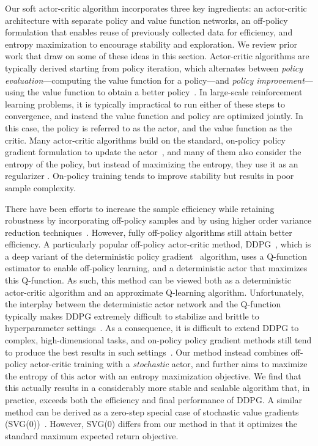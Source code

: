 Our soft actor-critic algorithm incorporates three key ingredients: an actor-critic architecture with separate policy and value function networks, an off-policy formulation that enables reuse of previously collected data for efficiency, and entropy maximization to encourage stability and exploration. We review prior work that draw on some of these ideas in this section. Actor-critic algorithms are typically derived starting from policy iteration, which alternates between \emph{policy evaluation}---computing the value function for a policy---and \emph{policy improvement}---using the value function to obtain a better policy~\citep{barto1983neuronlike,sutton1998reinforcement}. In large-scale reinforcement learning problems, it is typically impractical to run either of these steps to convergence, and instead the value function and policy are optimized jointly. In this case, the policy is referred to as the actor, and the value function as the critic. Many actor-critic algorithms build on the standard, on-policy policy gradient formulation to update the actor~\citep{peters2008reinforcement}, and many of them also consider the entropy of the policy, but instead of maximizing the entropy, they use it as an regularizer \citep{schulman2017proximal,schulman2015trust,mnih2016asynchronous,gruslys2017reactor}. On-policy training tends to improve stability but results in poor sample complexity.

There have been efforts to increase the sample efficiency while retaining robustness by incorporating off-policy samples and by using higher order variance reduction techniques~\citep{o2016pgq,gu2016q}. However, fully off-policy algorithms still attain better efficiency. A particularly popular off-policy actor-critic method, DDPG~\cite{lillicrap2015continuous}, which is a deep variant of the deterministic policy gradient~\citep{silver2014deterministic} algorithm, uses a Q-function estimator to enable off-policy learning, and a deterministic actor that maximizes this Q-function. As such, this method can be viewed both as a deterministic actor-critic algorithm and an approximate Q-learning algorithm. Unfortunately, the interplay between the deterministic actor network and the Q-function typically makes DDPG extremely difficult to stabilize and brittle to hyperparameter settings~\citep{duan2016benchmarking,henderson2017deep}. As a consequence, it is difficult to extend DDPG to complex, high-dimensional tasks, and on-policy policy gradient methods still tend to produce the best results in such settings~\citep{gu2016q}. Our method instead combines off-policy actor-critic training with a \emph{stochastic} actor, and further aims to maximize the entropy of this actor with an entropy maximization objective. We find that this actually results in a considerably more stable and scalable algorithm that, in practice, exceeds both the efficiency and final performance of DDPG. A similar method can be derived as a zero-step special case of stochastic value gradients (SVG(0))~\cite{heess2015learning}. However, SVG(0) differs from our method in that it optimizes the standard maximum expected return objective.

